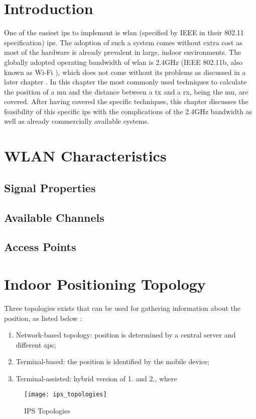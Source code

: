 \section{Introduction}
One of the easiest \acrlong{ips} to implement is \acrshort{wlan} (specified by IEEE in their 802.11 specification) \acrshort{ips}. The adoption of such a system comes without extra cost as most of the hardware is already prevalent in large, indoor environments.  The globally adopted operating bandwidth of \acrshort{wlan} is 2.4GHz (IEEE 802.11b, also known as Wi-Fi \cite{Li}), which does not come without its problems as discussed in a later chapter \cite{Techopedia} \cite{ElectronicsNotes}\cite{Cisco}. In this chapter the most commonly used techniques to calculate the position of a \acrlong{mu} and the distance between a \acrlong{tx} and a \acrlong{rx}, being the \acrlong{mu}, are covered. After having covered the specific techniques, this chapter discusses the feasibility of this specific \acrlong{ips} with the complications of the 2.4GHz bandwidth as well as already commercially available systems.
\section{WLAN Characteristics}
\subsection{Signal Properties}
\subsection{Available Channels}
\subsection{Access Points}
\section{Indoor Positioning Topology}
Three topologies exists that can be used for gathering information about the position, as listed below \cite{Henniges2012}:
\begin{enumerate}
\item Network-based topology: position is determined by a central server and different \acrshort{ap}s;
\item Terminal-based: the position is identified by the mobile device;
\item Terminal-assisted: hybrid version of 1. and 2., where 
\end{enumerate}
\begin{figure}[h!]
\centering
\texttt{[image: ips\_topologies]}
\caption{IPS Topologies ~\cite{Henniges2012}}
\label{fig:ips_topologies}
\end{figure}
